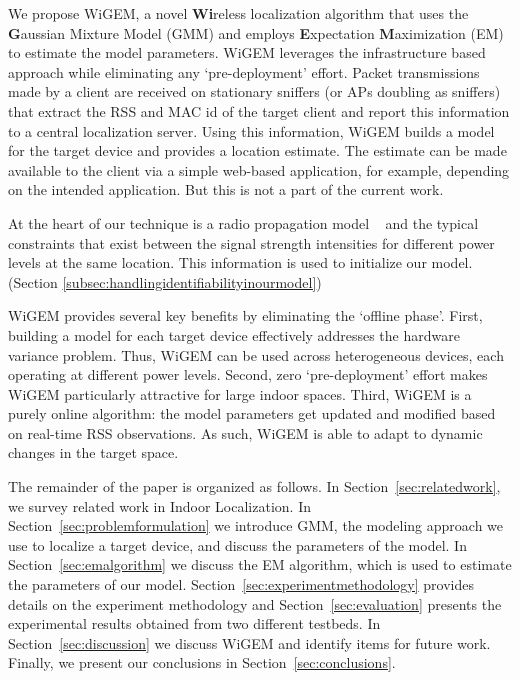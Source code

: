 We propose WiGEM, a novel {\bf Wi}reless
localization algorithm that uses the {\bf G}aussian Mixture Model (GMM) and employs {\bf E}xpectation {\bf M}aximization (EM) to estimate the model parameters. WiGEM leverages the infrastructure based approach while eliminating any `pre-deployment' effort. Packet transmissions made by a client are received on stationary sniffers (or APs doubling as sniffers) that extract the RSS and MAC id of the target client and report this information to a central localization server. Using this information, WiGEM builds a model for the target device and provides 
a location estimate. The estimate can be made available to the client via a simple web-based
application,  for example, depending on the intended application. But this is not a part
of the current work. 

{\color{red} At the heart of our technique is a radio propagation model ~\cite{Rappaport:2001:WCP:559977, Molkdar91} and the typical constraints that exist between the signal strength intensities for different power levels at the same location. This information is used to initialize our model. (Section \ref{subsec:handlingidentifiabilityinourmodel})}

WiGEM provides several key benefits by eliminating the `offline phase'. First, building a model for each target device effectively addresses the hardware variance problem. Thus, WiGEM can be used across heterogeneous devices, each operating at different power levels.  Second, zero `pre-deployment' effort makes WiGEM particularly attractive for large indoor spaces. Third, WiGEM is a purely online algorithm: the model parameters get updated and modified based on real-time RSS observations. As such, WiGEM is able to adapt to dynamic changes in the target space.

The remainder of the paper is organized as follows. In Section~\ref{sec:relatedwork}, we survey related work in Indoor Localization. In Section~\ref{sec:problemformulation} we introduce GMM, the modeling approach we use to localize a target device, and discuss the parameters of the model. In Section~\ref{sec:emalgorithm} we discuss the EM algorithm, which is used to estimate the parameters of our model. Section~\ref{sec:experimentmethodology} provides details on the experiment methodology and Section~\ref{sec:evaluation} presents the experimental results obtained from two different testbeds. {\color{red} In Section~\ref{sec:discussion} we discuss WiGEM and identify items for future work.}  Finally, we present our conclusions in Section~\ref{sec:conclusions}.


